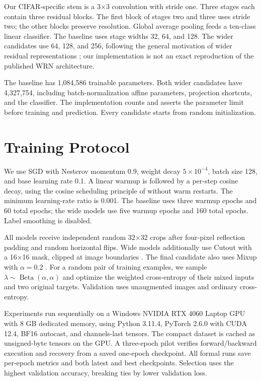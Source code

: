 \documentclass[letterpaper]{article}
\begin{document}
Our CIFAR-specific stem is a 3$\times$3 convolution with stride one. Three stages
each contain three residual blocks. The first block of stages two and three
uses stride two; the other blocks preserve resolution. Global average pooling
feeds a ten-class linear classifier. The baseline uses stage widths 32, 64,
and 128. The wider candidates use 64, 128, and 256, following the general
motivation of wider residual representations \citep{zagoruyko2016wide}; our
implementation is not an exact reproduction of the published WRN architecture.

The baseline has 1,084,586 trainable parameters. Both wider candidates have
4,327,754, including batch-normalization affine parameters, projection shortcuts,
and the classifier. The implementation counts and asserts the parameter limit
before training and prediction. Every candidate starts from random initialization.

\section{Training Protocol}
We use SGD with Nesterov momentum 0.9, weight decay $5\times10^{-4}$, batch size
128, and base learning rate 0.1. A linear warmup is followed by a per-step cosine
decay, using the cosine scheduling principle of \citet{loshchilov2017sgdr}
without warm restarts. The minimum learning-rate ratio is 0.001. The baseline
uses three warmup epochs and 60 total epochs; the wide models use five warmup
epochs and 160 total epochs. Label smoothing is disabled.

All models receive independent random 32$\times$32 crops after four-pixel
reflection padding and random horizontal flips. Wide models additionally use
Cutout with a 16$\times$16 mask, clipped at image boundaries
\citep{devries2017cutout}. The final candidate also uses Mixup with
$\alpha=0.2$ \citep{zhang2018mixup}. For a random pair of training examples,
we sample $\lambda\sim\operatorname{Beta}(\alpha,\alpha)$ and optimize the
weighted cross-entropy of their mixed inputs and two original targets.
Validation uses unaugmented images and ordinary cross-entropy.

Experiments run sequentially on a Windows NVIDIA RTX 4060 Laptop GPU with
8 GB dedicated memory, using Python 3.11.4, PyTorch 2.6.0 with CUDA 12.4,
BF16 autocast, and channels-last tensors. The compact dataset is cached as
unsigned-byte tensors on the GPU. A three-epoch pilot verifies forward/backward
execution and recovery from a saved one-epoch checkpoint. All formal runs save
per-epoch metrics and both latest and best checkpoints. Selection uses the
highest validation accuracy, breaking ties by lower validation loss.
\end{document}
